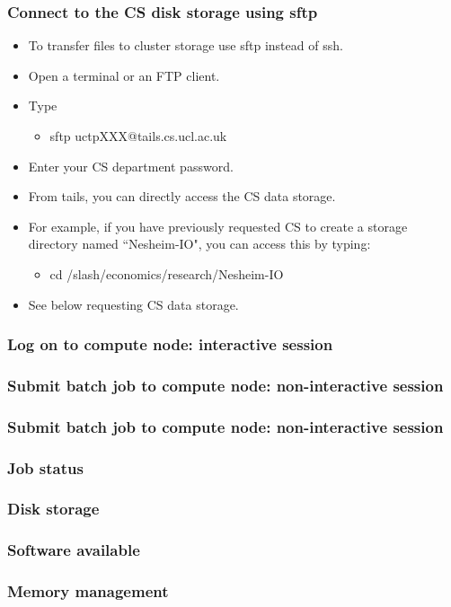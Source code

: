 \documentclass{beamer}
\begin{document}
\begin{frame}
\frametitle{Connect to the CS disk storage using sftp}
\begin{itemize}
\item To transfer files to cluster storage use sftp instead of ssh.
\item Open a terminal or an FTP client.
\item Type
\begin{itemize}
\item sftp uctpXXX@tails.cs.ucl.ac.uk
\end{itemize}
\item Enter your CS department password.
\item From tails, you can directly access the CS data storage. 
\item For example, if you have previously  requested CS to 
create a storage directory named ``Nesheim-IO", you can access this by typing:
\begin{itemize}
\item cd /slash/economics/research/Nesheim-IO
\end{itemize}
\item See below requesting CS data storage.
\end{itemize}
\end{frame}

\begin{frame}
\frametitle{Log on to compute node: interactive session}
\end{frame}

\begin{frame}
\frametitle{Submit batch job to compute node: non-interactive session}
\end{frame}

\begin{frame}
\frametitle{Submit batch job to compute node: non-interactive session}
\end{frame}

\begin{frame}
\frametitle{Job status}
\end{frame}

\begin{frame}
\frametitle{Disk storage}
\end{frame}

\begin{frame}
\frametitle{Software available}
\end{frame}

\begin{frame}
\frametitle{Memory management}
\end{frame}
\end{document}
